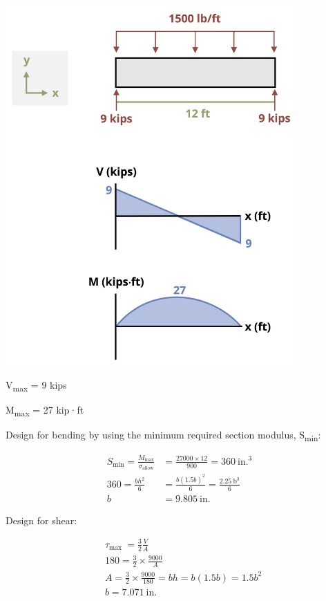 \documentclass[
  letterpaper,
  DIV=11,
  numbers=noendperiod]{scrreprt}
\begin{document}
\begin{tcolorbox}
\begin{tcolorbox}
\begin{center}
\includegraphics[width=4.35417in,height=\textheight]{images/CH11 PNGs/example11.8-2.png}
\end{center}

V\textsubscript{max} = 9 kips

M\textsubscript{max} = 27 kip·ft

Design for bending by using the minimum required section modulus,
S\textsubscript{min}:

\[
\begin{aligned} S_{\min }=\frac{M_{\max }}{\sigma_{\text {allow}}} & =\frac{27000 \times 12}{900}=360 \mathrm{~in.}^3 \\ 360=\frac{b h^2}{6} & =\frac{b(1.5b)^2}{6}=\frac{2.25 \mathrm{~b}^3}{6} \\ b & =9.805 \mathrm{~in.}\end{aligned}
\]

Design for shear:

\[
\begin{aligned} & \tau_{\text {max }}=\frac{3}{2} \frac{V}{A} \\ & 180=\frac{3}{2} \times \frac{9000}{A} \\ & A=\frac{3}{2} \times \frac{9000}{180}=b h=b(1.5 b)=1.5 b^2 \\ & b=7.071 \mathrm{~in.}\end{aligned}
\]


\end{tcolorbox}
\end{tcolorbox}
\end{document}
